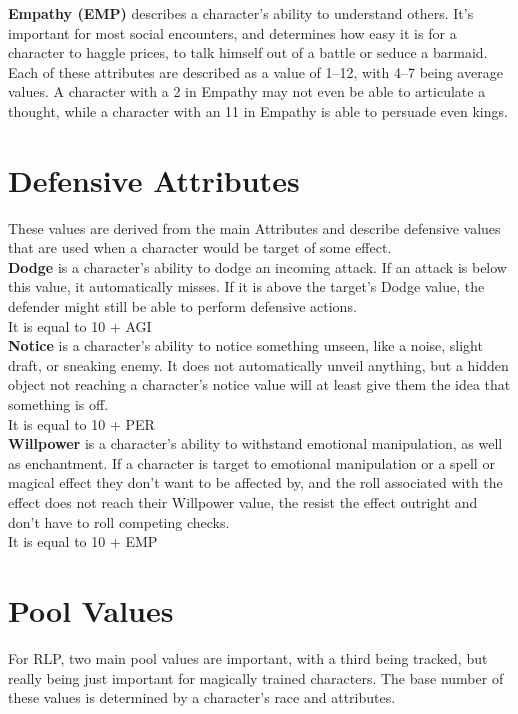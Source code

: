 \textbf{Empathy (EMP)}\label{stat:empathy} describes a character's ability to understand others.
It's important for most social encounters, and determines how easy it is for a character to haggle prices, to talk himself out of a battle or seduce a barmaid.\\
Each of these attributes are described as a value of 1--12, with 4--7 being average values.
A character with a 2 in Empathy may not even be able to articulate a thought, while a character with an 11 in Empathy is able to persuade even kings.


\section{Defensive Attributes}\label{sec:defensiveStats}
These values are derived from the main Attributes and describe defensive values that are used when a character would be target of some effect.\\


\textbf{Dodge}\label{stat:dodge} is a character's ability to dodge an incoming attack.
If an attack is below this value, it automatically misses.
If it is above the target's Dodge value, the defender might still be able to perform defensive actions.\\
It is equal to 10 + AGI\\


\textbf{Notice}\label{stat:notice} is a character's ability to notice something unseen, like a noise, slight draft, or sneaking enemy.
It does not automatically unveil anything, but a hidden object not reaching a character's notice value will at least give them the idea that something is off.\\
It is equal to 10 + PER\\


\textbf{Willpower}\label{stat:willpower} is a character's ability to withstand emotional manipulation, as well as enchantment.
If a character is target to emotional manipulation or a spell or magical effect they don't want to be affected by, and the roll associated with the effect does not reach their Willpower value, the resist the effect outright and don't have to roll competing checks.\\
It is equal to 10 + EMP\\


\section{Pool Values}\label{sec:pools}
For RLP, two main pool values are important, with a third being tracked, but really being just important for magically trained characters.
The base number of these values is determined by a character's race and attributes.\\


